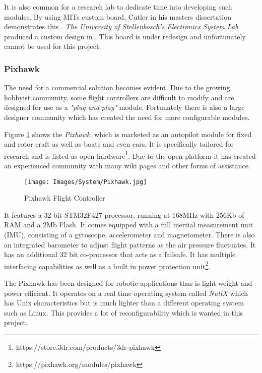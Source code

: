 			It is also common for a research lab to dedicate time into developing such modules. By using MITs custom board, Cutler in his masters dissertation demonstrates this \cite{How2012}. \textit{The University of Stellenbosch's Electronics System Lab} produced a custom design in . This board is under redesign and unfortunately cannot be used for this project.
		
			\subsubsection{Pixhawk}
			The need for a commercial solution becomes evident. Due to the growing hobbyist community, some flight controllers are difficult to modify and are designed for use as a \textit{"plug and play"} module. Fortunately there is also a large designer community which has created the need for more configurable modules.
			
			Figure \ref{IM_Pixhawk} shows the \textit{Pixhawk}, which is marketed as an autopilot module for fixed and rotor craft as well as boats and even cars. It is specifically tailored for research and is listed as open-hardware\footnote{https://store.3dr.com/products/3dr-pixhawk}. Due to the open platform it has created an experienced community with many wiki pages and other forms of assistance.
			
			\begin{figure}[H]
				\centering
				\texttt{[image: Images/System/Pixhawk.jpg]}     
				\caption{Pixhawk Flight Controller}
				\label{IM_Pixhawk}
			\end{figure}
			
			It features a 32 bit STM32F427 processor, running at 168MHz with 256Kb of RAM and a 2Mb Flash. It comes equipped with a full inertial measurement unit (IMU), consisting of a gyroscope, accelerometer and magnetometer. There is also an integrated barometer to adjust flight patterns as the air pressure fluctuates. It has an additional 32 bit co-processor that acts as a failsafe. It has multiple interfacing capabilities as well as a built in power protection unit\footnote{https://pixhawk.org/modules/pixhawk}. 
			
			The Pixhawk has been designed for robotic applications thus is light weight and power efficient. It operates on a real time operating system called \textit{NuttX} which has Unix characteristics but is much lighter than a different operating system such as Linux. This provides a lot of reconfigurability which is wanted in this project.
		
